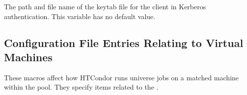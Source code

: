 \begin{description}
\label{param:KerberosClientKeytab}
\item[\Macro{KERBEROS\_CLIENT\_KEYTAB}]
  The path and file name of the keytab file for the client
  in Kerberos authentication.
  This variable has no default value.

\end{description}

%
%
%
\subsection{\label{sec:Config-VMs}Configuration File Entries
Relating to Virtual Machines}

These macros affect how HTCondor runs  universe jobs on
a matched machine within the pool.
They specify items related to the .

